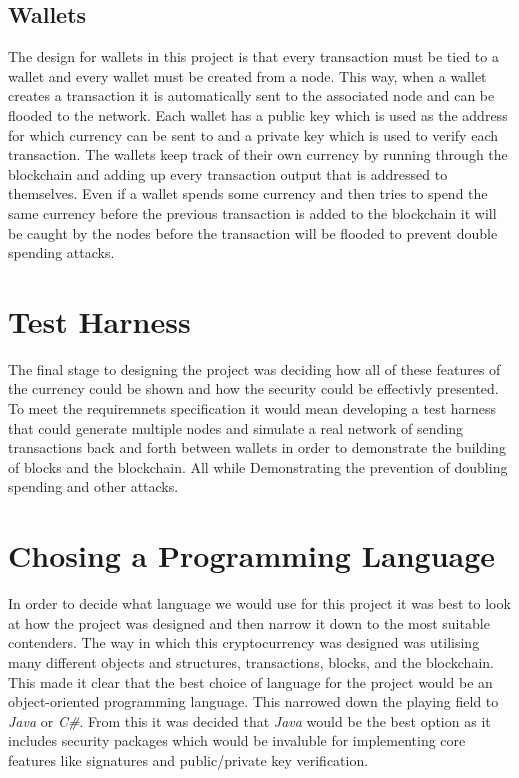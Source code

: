 \documentclass{l4proj}
\begin{document}
\subsection{Wallets}
The design for wallets in this project is that every transaction must be tied to a wallet and every wallet
must be created from a node. This way, when a wallet creates a transaction it is automatically sent to the
associated node and can be flooded to the network. Each wallet has a public key which is used as the address
for which currency can be sent to and a private key which is used to verify each transaction. The wallets 
keep track of their own currency by running through the blockchain and adding up every transaction output
that is addressed to themselves. Even if a wallet spends some currency and then tries to spend the same
currency before the previous transaction is added to the blockchain it will be caught by the nodes before the
transaction will be flooded to prevent double spending attacks.

\section{Test Harness}
The final stage to designing the project was deciding how all of these features of the currency could be shown
and how the security could be effectivly presented. To meet the requiremnets specification it would mean developing
a test harness that could generate multiple nodes and simulate a real network of sending transactions back and 
forth between wallets in order to demonstrate the building of blocks and the blockchain. All while Demonstrating
the prevention of doubling spending and other attacks. 

\section{Chosing a Programming Language}
In order to decide what language we would use for this project it was best to look at how the project was designed
and then narrow it down to the most suitable contenders. The way in which this cryptocurrency was designed was 
utilising many different objects and structures, transactions, blocks, and the blockchain. This made it clear that 
the best choice of language for the project would be an object-oriented programming language. This narrowed down
the playing field to \textit{Java} or \textit{C\#}. From this it was decided that \textit{Java} would be the best 
option as it includes security packages which would be invaluble for implementing core features like signatures and 
public/private key verification.
\end{document}
